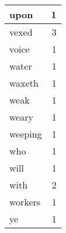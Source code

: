 \begin{center}
\begin{longtable}{l|r}
upon & 1 \\ \hline
vexed & 3 \\ \hline
voice & 1 \\ \hline
water & 1 \\ \hline
waxeth & 1 \\ \hline
weak & 1 \\ \hline
weary & 1 \\ \hline
weeping & 1 \\ \hline
who & 1 \\ \hline
will & 1 \\ \hline
with & 2 \\ \hline
workers & 1 \\ \hline
ye & 1 \\ \hline
\end{longtable}
\end{center}



\normalsize



